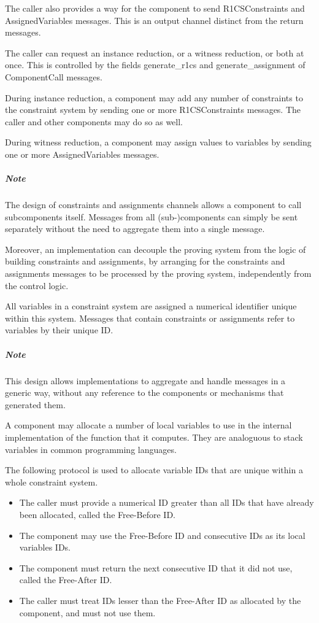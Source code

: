 	The caller also provides a way for the component to send 
	R1CSConstraints and AssignedVariables messages.
	This is an output channel distinct from the return messages.

	The caller can request an instance reduction, or a witness reduction, or both at once.
	This is controlled by the fields generate\_r1cs and generate\_assignment of ComponentCall messages.

	During instance reduction,
	a component may add any number of constraints to the constraint system
	by sending one or more R1CSConstraints messages.
	The caller and other components may do so as well.

	During witness reduction,
	a component may assign values to variables
	by sending one or more AssignedVariables messages.

	\subparagraph{Note}
	The design of constraints and assignments channels
	allows a component to call subcomponents itself.
	Messages from all (sub-)components can simply be sent separately
	without the need to aggregate them into a single message.
	
	Moreover, an implementation can decouple the proving system
	from the logic of building constraints and assignments,
	by arranging for the constraints and assignments messages
	to be processed by the proving system, independently from the control logic.


	All variables in a constraint system are assigned a numerical identifier
	unique within this system.
	Messages that contain constraints or assignments refer to variables by their
	unique ID.

	\subparagraph{Note}
	This design allows implementations to aggregate and handle messages in a generic way,
	without any	reference to the components or mechanisms that generated them.



	A component may allocate a number of local variables to use
	in the internal implementation of the function that it computes.
	They are analoguous to stack variables in common programming languages.

	The following protocol is used to allocate variable IDs that are
	unique within a whole constraint system.
	\begin{itemize}
		\item The caller must provide a numerical ID greater than all IDs that have already been allocated, called the Free-Before ID.
		\item The component may use the Free-Before ID and consecutive IDs as its local variables IDs.
		\item The component must return the next consecutive ID that it did not use, called the Free-After ID.
		\item The caller must treat IDs lesser than the Free-After ID as allocated by the component,
			and must not use them.
	\end{itemize}

